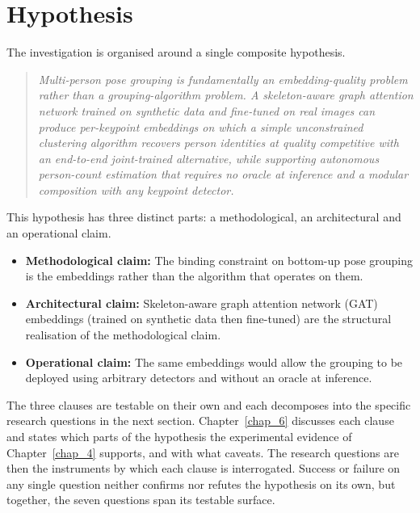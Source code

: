 \section{Hypothesis}
\label{sec_intro_hypothesis}

The investigation is organised around a single composite hypothesis.

\begin{quote}
    \emph{Multi-person pose grouping is fundamentally an embedding-quality problem rather than a grouping-algorithm problem.
    A skeleton-aware graph attention network trained on synthetic data and fine-tuned 
    on real images can produce per-keypoint embeddings on which a simple unconstrained clustering algorithm
    recovers person identities at quality competitive with an end-to-end joint-trained alternative,
    while supporting autonomous person-count estimation that requires no oracle at inference 
    and a modular composition with any keypoint detector.}
\end{quote}

This hypothesis has three distinct parts: a methodological, an architectural and an operational claim.

\begin{itemize}
    \item \textbf{Methodological claim:} The binding constraint on bottom-up pose grouping is the embeddings rather
    than the algorithm that operates on them. 
    \item \textbf{Architectural claim:} Skeleton-aware graph attention network (GAT) embeddings
    (trained on synthetic data then fine-tuned) are the structural realisation of the methodological claim.
    \item \textbf{Operational claim:} The same embeddings would allow the grouping to be deployed 
    using arbitrary detectors and without an oracle at inference.
\end{itemize}

The three clauses are testable on their own and each decomposes into the specific research questions in the next section.
Chapter~\ref{chap_6} discusses each clause and states which parts of the hypothesis the experimental
evidence of Chapter~\ref{chap_4} supports, and with what caveats.
The research questions are then the instruments by which each clause is interrogated.
Success or failure on any single question neither confirms nor refutes the hypothesis on its own, but
together, the seven questions span its testable surface.